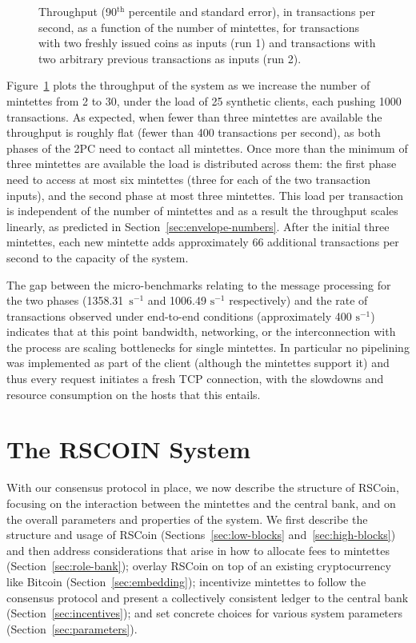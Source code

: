 \documentclass[conference]{IEEEtran}
\newcommand{\rscoin}{\textsf{RSCoin}\xspace}
\newcommand{\secrscoin}{RSCOIN\xspace}
\begin{document}
\begin{figure}[t!]
\centering
{}\fi
\caption{Throughput (90$^{\text{th}}$ percentile and standard error), in
transactions per second, as a function of the number of mintettes, for
transactions with two freshly issued coins as inputs (run 1) and transactions
with two arbitrary previous transactions as inputs (run 2).}
\label{fig:throughput}
\end{figure}

Figure~\ref{fig:throughput} plots the throughput of the system as we increase
the number of mintettes from 2 to 30, under the load of 25 synthetic clients,
each pushing 1000 transactions.  As expected, when fewer than three mintettes
are available the throughput is roughly flat (fewer than 400 transactions per
second), as both phases of the 2PC need to contact all mintettes.  Once more
than the minimum of three mintettes are available the load is distributed
across them: the first phase need to access at most six mintettes (three
for each of the two transaction inputs), and the second phase at most three
mintettes. This load per transaction is independent of the number of mintettes
and as a result the throughput scales linearly, as predicted in
Section~\ref{sec:envelope-numbers}.  After the initial three mintettes, each
new mintette adds approximately 66 additional transactions per second to the
capacity of the system.

The gap between the micro-benchmarks relating to the message processing for
the two phases (1358.31~$\si{\second}^{-1}$ and 1006.49 $\si{\second}^{-1}$
respectively) and the rate of transactions observed under end-to-end
conditions (approximately 400 $\si{\second}^{-1}$) indicates that at this
point bandwidth, networking, or the interconnection with the process are
scaling bottlenecks for single mintettes. In particular no pipelining was
implemented as part of the client (although the mintettes support it) and thus
every request initiates a fresh TCP connection, with the slowdowns and
resource
consumption on the hosts that this entails.

\section{The \secrscoin System}\label{sec:system}

With our consensus protocol in place, we now describe the structure of
\rscoin,
focusing on the interaction between the mintettes and the central bank, and on
the overall parameters and properties of the system.  We first describe the
structure and usage of \rscoin
(Sections~\ref{sec:low-blocks} and~\ref{sec:high-blocks}) and then
address considerations that arise in how to allocate fees to mintettes
(Section~\ref{sec:role-bank}); overlay \rscoin on top of an existing
cryptocurrency like Bitcoin (Section~\ref{sec:embedding}); incentivize
mintettes to follow the consensus protocol and present a collectively
consistent ledger to the central bank
(Section~\ref{sec:incentives}); and set concrete choices for various
system parameters (Section~\ref{sec:parameters}).
\end{document}
